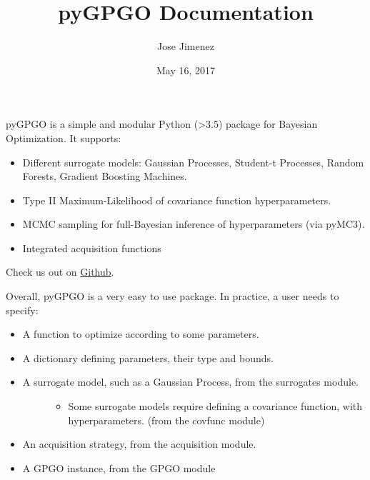\documentclass[letterpaper,10pt,english]{sphinxmanual}
\title{pyGPGO Documentation}
\date{May 16, 2017}
\author{Jose Jimenez}
\begin{document}
\maketitle
\tableofcontents
{}\label{index::doc}


pyGPGO is a simple and modular Python (\textgreater{}3.5) package for Bayesian Optimization. It supports:
\begin{itemize}
\item {} 
Different surrogate models: Gaussian Processes, Student-t Processes, Random Forests, Gradient Boosting Machines.

\item {} 
Type II Maximum-Likelihood of covariance function hyperparameters.

\item {} 
MCMC sampling for full-Bayesian inference of hyperparameters (via pyMC3).

\item {} 
Integrated acquisition functions

\end{itemize}

Check us out on  \href{https://github.com/hawk31/pyGPGO}{Github}.

Overall, pyGPGO is a very easy to use package. In practice, a user needs to specify:
\begin{itemize}
\item {} 
A function to optimize according to some parameters.

\item {} 
A dictionary defining parameters, their type and bounds.

\item {} \begin{description}
\item[{A surrogate model, such as a Gaussian Process, from the surrogates module.}] \leavevmode\begin{itemize}
\item {} 
Some surrogate models require defining a covariance function, with hyperparameters. (from the covfunc module)

\end{itemize}

\end{description}

\item {} 
An acquisition strategy, from the acquisition module.

\item {} 
A GPGO instance, from the GPGO module

\end{itemize}
\end{document}
